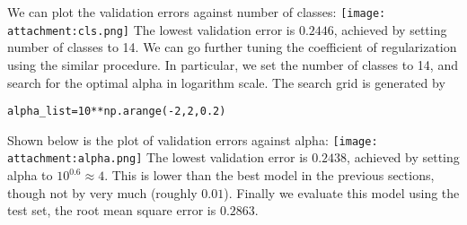 \documentclass[11pt]{article}
\makeatletter
\def\maxwidth{\ifdim\Gin@nat@width>\linewidth\linewidth
    \else\Gin@nat@width\fi}
\let\Oldincludegraphics\includegraphics
\renewcommand{\includegraphics}[1]{\Oldincludegraphics[width=.8\maxwidth]{#1}}
\makeatother
\begin{document}
We can plot the validation errors against number of classes:
\texttt{[image: attachment:cls.png]} The lowest validation error is
\(0.2446\), achieved by setting number of classes to 14. We can go
further tuning the coefficient of regularization using the similar
procedure. In particular, we set the number of classes to 14, and search
for the optimal alpha in logarithm scale. The search grid is generated
by

\begin{verbatim}
alpha_list=10**np.arange(-2,2,0.2)
\end{verbatim}

Shown below is the plot of validation errors against alpha:
\texttt{[image: attachment:alpha.png]} The lowest validation error is
\(0.2438\), achieved by setting alpha to \(10^{0.6}\approx4\). This is
lower than the best model in the previous sections, though not by very
much (roughly \(0.01\)). Finally we evaluate this model using the test
set, the root mean square error is \(0.2863\).


    
    
    
    
\end{document}
